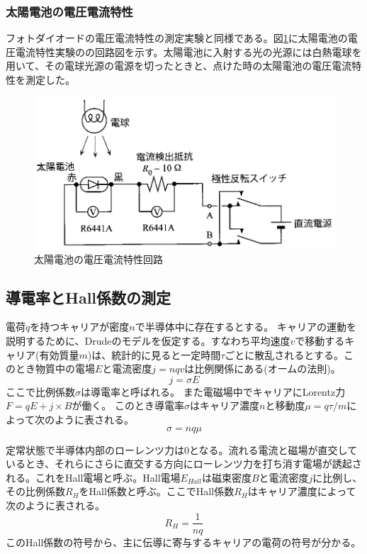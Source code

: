 \documentclass[11pt,a4]{jarticle}
\begin{document}
\subsubsection{太陽電池の電圧電流特性}
フォトダイオードの電圧電流特性の測定実験と同様である。図\ref{fig:solor_cell_setup}に太陽電池の電圧電流特性実験のの回路図を示す。太陽電池に入射する光の光源には白熱電球を用いて、その電球光源の電源を切ったときと、点けた時の太陽電池の電圧電流特性を測定した。
\begin{figure}[!htbp]
   \begin{center}
    \includegraphics[width=0.7\hsize]{./solor_cell_setup.eps}
    \caption{太陽電池の電圧電流特性回路}
     \label{fig:solor_cell_setup}
   \end{center}
\end{figure}

\subsection{導電率とHall係数の測定}
電荷$q$を持つキャリアが密度$n$で半導体中に存在するとする。
キャリアの運動を説明するために、Drudeのモデルを仮定する。すなわち平均速度$v$で移動するキャリア(有効質量$m$)は、統計的に見ると一定時間$\tau$ごとに散乱されるとする。このとき物質中の電場$E$と電流密度$j=nqv$は比例関係にある(オームの法則)。
\begin{equation} 
j = \sigma E
\label{eq:conductivity}
\end{equation}
ここで比例係数$\sigma$は導電率と呼ばれる。
また電磁場中でキャリアにLorentz力$F = qE + j \times B$が働く。
このとき導電率$\sigma$はキャリア濃度$n$と移動度$\mu=q\tau/m$によって次のように表される。
\begin{equation}
\sigma = n q \mu
\label{eq:sigma}
\end{equation}

定常状態で半導体内部のローレンツ力は0となる。流れる電流と磁場が直交しているとき、それらにさらに直交する方向にローレンツ力を打ち消す電場が誘起される。これをHall電場と呼ぶ。Hall電場$E_{Hall}$は磁束密度$B$と電流密度$j$に比例し、その比例係数$R_H$をHall係数と呼ぶ。ここでHall係数$R_H$はキャリア濃度によって次のように表される。
\begin{equation}
R_H = \frac{1}{nq} 
\label{eq:R_H}
\end{equation}
このHall係数の符号から、主に伝導に寄与するキャリアの電荷の符号が分かる。
\end{document}
